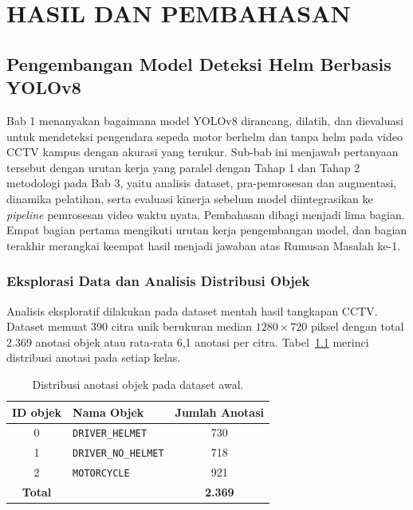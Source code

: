 
\chapter{HASIL DAN PEMBAHASAN}
\label{chap:hasil}

\section{Pengembangan Model Deteksi Helm Berbasis YOLOv8}
\label{sec:model-deteksi}
Bab 1 menanyakan bagaimana model YOLOv8 dirancang, dilatih, dan dievaluasi untuk mendeteksi pengendara sepeda motor berhelm dan tanpa helm pada video CCTV kampus dengan akurasi yang terukur. Sub-bab ini menjawab pertanyaan tersebut dengan urutan kerja yang paralel dengan Tahap 1 dan Tahap 2 metodologi pada Bab 3, yaitu analisis dataset, pra-pemrosesan dan augmentasi, dinamika pelatihan, serta evaluasi kinerja sebelum model diintegrasikan ke \textit{pipeline} pemrosesan video waktu nyata. Pembahasan dibagi menjadi lima bagian. Empat bagian pertama mengikuti urutan kerja pengembangan model, dan bagian terakhir merangkai keempat hasil menjadi jawaban atas Rumusan Masalah ke-1.
\subsection{Eksplorasi Data dan Analisis Distribusi Objek}
\label{subsec:eda-dataset}

Analisis eksploratif dilakukan pada dataset mentah hasil tangkapan CCTV. Dataset memuat 390 citra unik berukuran median $1280 \times 720$ piksel dengan total 2.369 anotasi objek atau rata-rata 6,1 anotasi per citra. Tabel~\ref{tab:distribusi-objek} merinci distribusi anotasi pada setiap kelas.

\begin{table}[htbp]
  \centering
  \caption{Distribusi anotasi objek pada dataset awal.}
  \label{tab:distribusi-objek}
  \begin{tabular}{clc}
    \hline
    \textbf{ID objek} & \textbf{Nama Objek} & \textbf{Jumlah Anotasi} \\
    \hline
    0 & \texttt{DRIVER\_HELMET}     & 730 \\
    1 & \texttt{DRIVER\_NO\_HELMET} & 718 \\
    2 & \texttt{MOTORCYCLE}         & 921 \\
    \hline
    \textbf{Total} & & \textbf{2.369} \\
    \hline
  \end{tabular}
\end{table}

